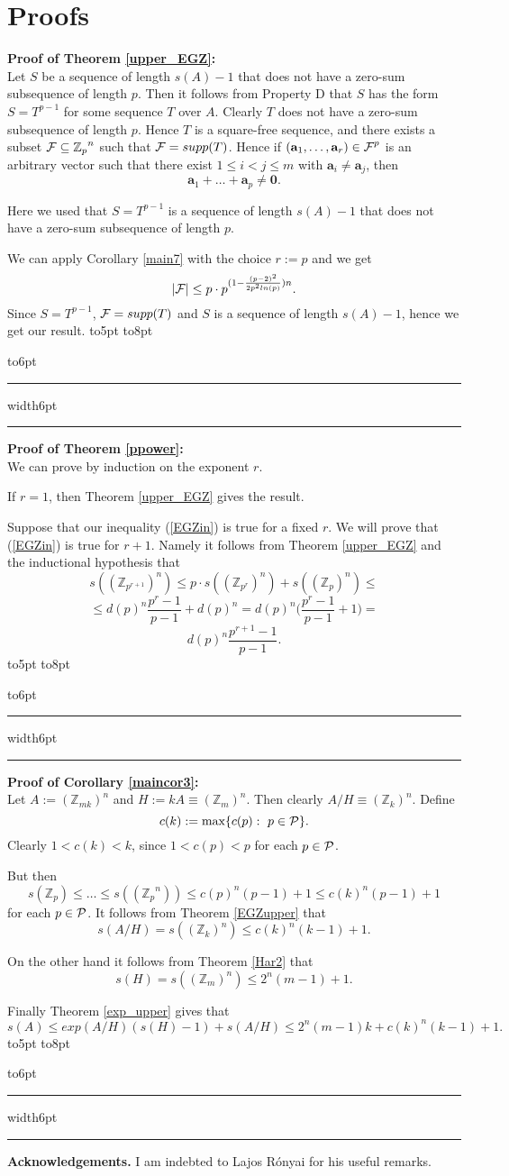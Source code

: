 \documentclass[12pt]{article}
\newcommand{\openbox}{\leavevmode
  \hbox to8pt{\hfil\vrule\vbox to6pt{\hrule width6pt\vfil\hrule}\vrule}}
\newcommand{\qed}{\hbox to5pt{ } \hfill \openbox\bigskip\medskip}
\newcommand{\Zp}{\mathbb Z _p}
\newcommand{\cF}{\mbox{$\cal F$}}
\newcommand{\cP}{\mbox{$\cal P$}}
\newcommand{\ve}[1]{\mathbf{#1}}
\newcommand{\Z}{\mathbb Z}
\begin{document}
\section{Proofs}



{\bf Proof of Theorem \ref{upper_EGZ}:}\\

Let $S$ be a sequence of length $s(A)-1$ that does not have a zero-sum subsequence of length $p$. Then  
it follows from Property D that $S$ has the form $S=T^{p-1}$ for some sequence $T$ over $A$. Clearly $T$ does not have a zero-sum subsequence of length $p$. Hence $T$ is a square-free sequence, and there exists a 
subset  $\cF\subseteq {\Zp}^n$ such that $\cF=supp(T)$. Hence  if $(\ve a_1, \ldots, \ve a_{r})\in {\cF}^{p}$ is an arbitrary vector such that 
there exist $1\leq i<j\leq m$ with $\ve a_i\ne \ve a_j$, then 
$$
\ve a_1+ \ldots +\ve a_p \ne \ve 0.
$$

Here we used that $S=T^{p-1}$ is a sequence of length $s(A)-1$ that does not have a zero-sum subsequence of length $p$.

We can apply Corollary \ref{main7} with the choice $r:=p$ and we get
$$
|\cF|\leq p\cdot p^{(1-\frac{(p-2)^2}{2 p^2ln(p)})n}.
$$
Since  $S=T^{p-1}$, $\cF=supp(T)$ and $S$ is a sequence of length $s(A)-1$, hence we get our result.  
\qed

{\bf Proof of Theorem \ref{ppower}:}\\

We can prove by induction on the exponent $r$.

If $r=1$, then Theorem \ref{upper_EGZ} gives the result.

Suppose that our inequality (\ref{EGZin}) is true for  a  fixed $r$. We will prove that (\ref{EGZin}) is true for $r+1$. 
Namely it follows from Theorem \ref{upper_EGZ} and the inductional hypothesis that 
$$
s(({\Z}_{p^{r+1}})^n) \leq p\cdot s(({\Z}_{p^r})^n) + s(({\Z}_{p})^n)\leq 
$$
$$
\leq d(p)^n \frac{p^r-1}{p-1} + d(p)^n=   d(p)^n \Big(  \frac{p^r-1}{p-1}  +1\Big)=
$$
$$
d(p)^n \frac{p^{r+1}-1}{p-1}.
$$
\qed

{\bf Proof of Corollary \ref{maincor3}:}\\

Let $A:=({\Z}_{mk})^n$ and $H:=kA \equiv ({\Z}_{m})^n$. Then clearly $A/H \equiv ({\Z}_{k})^n$. 
Define
$$
c(k):=\mbox{max}\{c(p):~ p\in \cP \}.
$$
Clearly $1<c(k)<k$, since $1<c(p)<p$ for each $p\in \cP$.

But then 
$$
s({\Zp})\leq \ldots \leq s(({\Zp}^n)) \leq c(p)^n(p-1)+1\leq c(k)^n(p-1)+1
$$
for each $p\in \cP$. It follows from Theorem \ref{EGZupper} that 
$$
s(A/H)=s(({\Z}_{k})^n)\leq c(k)^n(k-1)+1.
$$

On the other hand it follows from Theorem \ref{Har2} that
$$
s(H)=s(({\Z}_{m})^n) \leq 2^n(m-1)+1.
$$

Finally Theorem \ref{exp_upper} gives that
$$
s(A)\leq exp(A/H)(s(H)-1)+s(A/H)\leq 2^n(m-1)k + c(k)^n(k-1)+1.
$$
\qed



{\bf Acknowledgements.} 
I am indebted to  Lajos R\'onyai for his useful remarks. 
\end{document}
